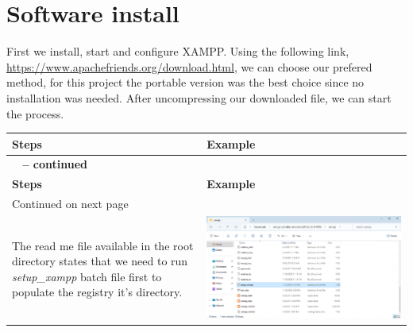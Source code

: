 \documentclass[11pt,a4paper]{report}
\begin{document}
    \section{Software install}
        \begin{flushleft}
            First we install, start and configure XAMPP. Using the following link, \href{https://www.apachefriends.org/download.html}{https://www.apachefriends.org/download.html}, we can choose our prefered method, for this project the portable version was the best choice since no installation was needed. After uncompressing our downloaded file, we can start the process.
                \begin{center}
                    \begin{longtable}{ m{5cm} l }
                        \textbf{Steps} & \textbf{Example} \\
                        \hline
                        \endfirsthead
                        {{\bfseries \tablename\ \thetable{} -- continued}} \\
                        \textbf{Steps} & \textbf{Example} \\
                        \hline
                        \endhead
                        \hline Continued on next page \\
                        \endfoot
                        \endlastfoot

                        The read me file available in the root directory states that we need to run \textit{setup\_xampp} batch file first to populate the registry it's directory.
                        & \includegraphics[scale=0.35,valign=c]{phase1/images/install_xampp08} \\
                        \hline
                        

\end{longtable}
\end{center}
\end{flushleft}
\end{document}
